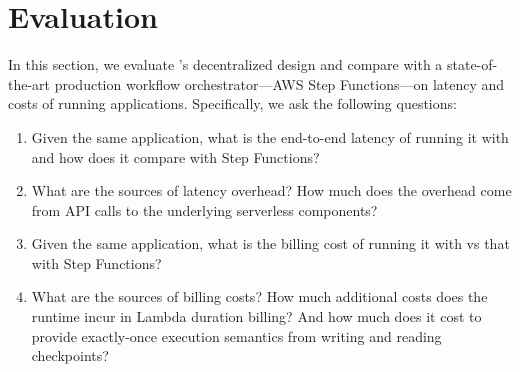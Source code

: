 \section{Evaluation}\label{sec:eval}

In this section, we evaluate \name{}'s decentralized design and compare
with a state-of-the-art production workflow orchestrator---AWS Step
Functions---on latency and costs of running applications. Specifically, we ask
the following questions:

\begin{enumerate}
	
    \item Given the same application, what is the end-to-end latency of
    running it with \name{} and how does it compare with Step Functions?
	
    \item What are the sources of  latency overhead? How much does
    the overhead come from API calls to the underlying serverless components?
	
	\item Given the same application, what is the billing cost of running it
	with \name{} vs that with Step Functions?
	
	\item What are the sources of  billing costs? How much additional
	costs does the \name{} runtime incur in Lambda duration billing? And how
	much does it cost to provide exactly-once execution semantics from writing
	and reading checkpoints?
	
\end{enumerate}


	
	
	
	
